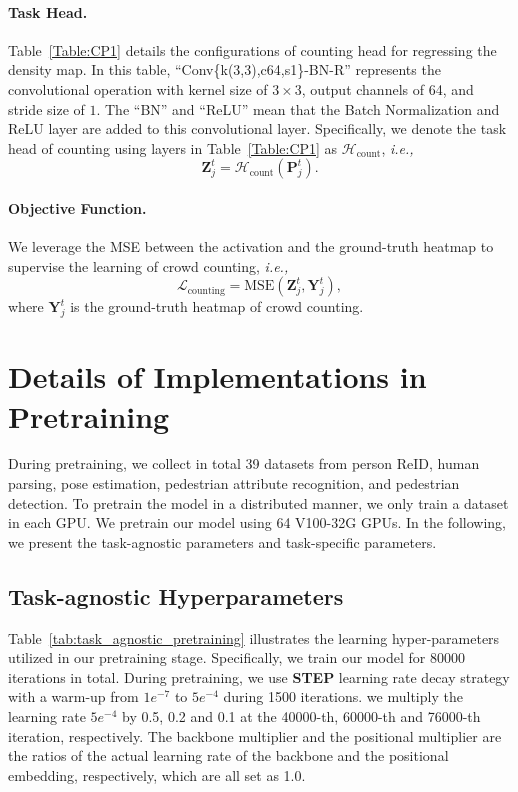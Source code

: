 \documentclass[10pt,twocolumn,letterpaper]{article}
\begin{document}
\paragraph{Task Head.} Table~\ref{Table:CP1} details the configurations of counting head for regressing the density map. In this table, ``Conv\{k(3,3),c64,s1\}-BN-R'' represents the convolutional operation with kernel size of $3 \times 3$, output channels of 64, and stride size of $1$. The ``BN'' and ``ReLU'' mean that the Batch Normalization and ReLU layer are added to this convolutional layer. Specifically, we denote the task head of counting using layers in Table~\ref{Table:CP1} as $\mathcal{H}_{\text{count}}$, \emph{i.e.,}
\begin{equation}
    \mathbf{Z}^t_j = \mathcal{H}_{\text{count}}(\mathbf{P}_j^t).
\end{equation}


\paragraph{Objective Function.} We leverage the MSE between the activation and the ground-truth heatmap to supervise the learning of crowd counting, \emph{i.e.,}
\begin{equation}
    \mathcal{L}_{\text{counting}} = \text{MSE}(\mathbf{Z}^t_j, \mathbf{Y}^t_j),
\end{equation}
where $\mathbf{Y}^t_j$ is the ground-truth heatmap of crowd counting.

\section{Details of Implementations in Pretraining}
During pretraining, we collect in total 39 datasets from person ReID, human parsing, pose estimation, pedestrian attribute recognition, and pedestrian detection. To pretrain the model in a distributed manner, we only train a dataset in each GPU. We pretrain our model using 64 V100-32G GPUs. In the following, we present the task-agnostic parameters and task-specific parameters.

\subsection{Task-agnostic Hyperparameters}
Table~\ref{tab:task_agnostic_pretraining} illustrates the learning hyper-parameters utilized in our pretraining stage. Specifically, we train our model for 80000 iterations in total. During pretraining, we use \textbf{STEP} learning rate decay strategy with a warm-up from $1e^{-7}$ to $5e^{-4}$ during 1500 iterations. we multiply the learning rate $5e^{-4}$ by 0.5, 0.2 and 0.1 at the 40000-th, 60000-th and 76000-th iteration, respectively. The backbone multiplier and the positional multiplier are the ratios of the actual learning rate of the backbone and the positional embedding, respectively, which are all set as 1.0.
\end{document}
